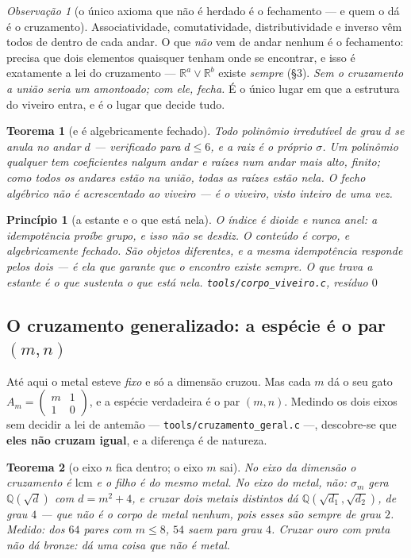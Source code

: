 \documentclass[11pt]{article}
\newcommand{\code}[1]{\texttt{\small #1}}
\newcommand{\R}{\mathbb R}
\newcommand{\Q}{\mathbb Q}
\theoremstyle{plain}
\newtheorem{teorema}{Teorema}
\newtheorem{principio}{Princípio}
\theoremstyle{remark}
\newtheorem{obs}{Observação}
\begin{document}
\begin{obs}[o único axioma que não é herdado é o fechamento --- e quem o dá é o cruzamento]
Associatividade, comutatividade, distributividade e inverso vêm todos de dentro de cada andar. O que
\emph{não} vem de andar nenhum é o fechamento: precisa que dois elementos quaisquer tenham onde se
encontrar, e isso é exatamente a lei do cruzamento --- $\R^a\vee\R^b$ existe \emph{sempre}
(\S3). \emph{Sem o cruzamento a união seria um amontoado; com ele, fecha.} É o único lugar em que a
estrutura do viveiro entra, e é o lugar que decide tudo.
\end{obs}

\begin{teorema}[e é algebricamente fechado]
Todo polinômio irredutível de grau $d$ se anula no andar $d$ --- verificado para $d\le6$, e a raiz
é o próprio $\sigma$. Um polinômio qualquer tem coeficientes nalgum andar e raízes num andar mais
alto, \emph{finito}; como todos os andares estão na união, todas as raízes estão nela. \emph{O fecho
algébrico não é acrescentado ao viveiro --- é o viveiro, visto inteiro de uma vez.}
\end{teorema}

\begin{principio}[a estante e o que está nela]
O índice é dioide e nunca anel: a idempotência proíbe grupo, e isso não se desdiz. O conteúdo é
corpo, e algebricamente fechado. São objetos diferentes, e a mesma idempotência responde pelos dois
--- é ela que garante que o encontro existe sempre. \emph{O que trava a estante é o que sustenta o
que está nela.} \hfill{\small\code{tools/corpo\_viveiro.c}, resíduo $0$}
\end{principio}

\subsection{O cruzamento generalizado: a espécie é o par $(m,n)$}

Até aqui o metal esteve \emph{fixo} e só a dimensão cruzou. Mas cada $m$ dá o seu gato
$A_m=\left(\begin{smallmatrix}m&1\\1&0\end{smallmatrix}\right)$, e a espécie verdadeira é o par
$(m,n)$. Medindo os dois eixos sem decidir a lei de antemão --- \code{tools/cruzamento\_geral.c}
---, descobre-se que \textbf{eles não cruzam igual}, e a diferença é de natureza.

\begin{teorema}[o eixo $n$ fica dentro; o eixo $m$ sai]
No eixo da dimensão o cruzamento é $\mathrm{lcm}$ e o filho é \emph{do mesmo metal}. No eixo do
metal, não: $\sigma_m$ gera $\Q(\sqrt{d})$ com $d=m^2+4$, e cruzar dois metais distintos dá
$\Q(\sqrt{d_1},\sqrt{d_2})$, de grau $4$ --- que não é o corpo de metal nenhum, pois esses são
sempre de grau $2$. Medido: dos $64$ pares com $m\le8$, $54$ saem para grau $4$.
\emph{Cruzar ouro com prata não dá bronze: dá uma coisa que não é metal.}
\end{teorema}
\end{document}
